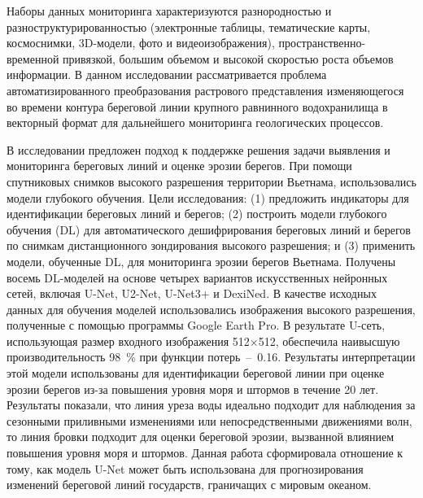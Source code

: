 \documentclass[732,14pt,final]{studrep}
\begin{document}
Наборы данных мониторинга характеризуются разнородностью и разноструктурированностью (электронные таблицы, тематические карты, космоснимки, 3D-модели, фото и видеоизображения), пространственно-временной привязкой, большим объемом и высокой скоростью роста объемов информации. В данном исследовании рассматривается проблема автоматизированного преобразования растрового представления изменяющегося во времени контура  береговой линии крупного равнинного водохранилища в векторный формат для дальнейшего мониторинга геологических
процессов.

В исследовании \cite{b1} предложен подход к поддержке решения задачи выявления и мониторинга береговых линий и оценке эрозии берегов. При помощи спутниковых снимков высокого разрешения территории Вьетнама, использовались модели глубокого обучения. Цели исследования: (1) предложить индикаторы для идентификации береговых линий и берегов; (2) построить модели глубокого обучения (DL) для автоматического дешифрирования береговых линий и берегов по снимкам дистанционного зондирования высокого разрешения; и (3) применить модели, обученные DL, для мониторинга эрозии берегов Вьетнама. Получены восемь DL-моделей на основе четырех вариантов искусственных нейронных сетей, включая U-Net, U2-Net, U-Net3+ и DexiNed. В качестве исходных данных для обучения моделей использовались изображения высокого разрешения, полученные с помощью программы Google Earth Pro. В результате U-сеть, использующая размер входного изображения 512×512, обеспечила наивысшую производительность 98~\% при функции потерь~--~0.16. Результаты интерпретации этой модели использованы для идентификации береговой линии при оценке эрозии берегов из-за повышения уровня моря и штормов в течение 20 лет. Результаты показали, что линия уреза воды идеально подходит для наблюдения за сезонными приливными изменениями или непосредственными движениями волн, то линия бровки подходит для оценки береговой эрозии, вызванной влиянием повышения уровня моря и штормов. Данная работа сформировала отношение к тому, как модель U-Net может быть использована для прогнозирования изменений береговой линий государств, граничащих с мировым океаном.
\end{document}
